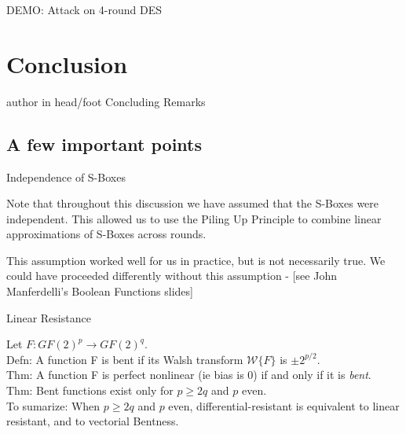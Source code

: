 \documentclass[9pt]{beamer}
\begin{document}
\begin{frame}
DEMO: Attack on 4-round DES
\end{frame}


\section{Conclusion}
\begin{frame}
\begin{beamercolorbox}[ht=2.5ex,dp=1.125ex,center,rounded=true,shadow=true]{author in head/foot}
Concluding Remarks
\end{beamercolorbox}
\end{frame}

\subsection{A few important points}
\begin{frame}
Independence of S-Boxes

\vspace{5mm}
\pause Note that throughout this discussion we have assumed that the S-Boxes were independent. This allowed us to use the Piling Up Principle to combine linear approximations of S-Boxes across rounds.

\vspace{3mm}
\pause This assumption worked well for us in practice, but is not necessarily true. We could have proceeded differently without this assumption - [see John Manferdelli's Boolean Functions slides]
\end{frame}

\begin{frame}
Linear Resistance

\vspace{5mm}
Let $F: GF(2)^p \rightarrow GF(2)^q$.\\
\vspace{3mm}
\pause Defn: A function F is bent if its Walsh transform $\mathcal{W}\{F\}$ is $\pm 2^{p/2}$.\\
\vspace{3mm}
\pause Thm: A function F is perfect nonlinear (ie bias is 0) if and only if it is \textit{bent}. \\
\vspace{3mm}
\pause Thm: Bent functions exist only for $p \geq 2q$ and $p$ even. \\
\vspace{5mm}
\pause To sumarize: When $p\geq 2q$ and $p$ even, differential-resistant is equivalent to linear resistant, and to vectorial Bentness.
\end{frame}
\end{document}
